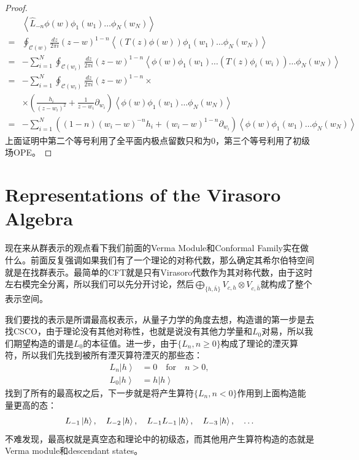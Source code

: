 \begin{proof}
	\begin{equation}
		\begin{aligned}
			&\left\langle\widehat{L}_{-n}\phi(w)\phi_1(w_1)\ldots\phi_N(w_N)\right\rangle  \\
			=&\oint_{\mathcal{C}(w)}\frac{dz}{2\pi i}\left.(z-w)^{1-n}\left\langle\left(T(z)\phi(w)\right)\phi_1(w_1)\ldots\phi_N(w_N)\right\rangle\right.  \\
			=&-\sum_{i=1}^N\oint_{\mathcal{C}(w_i)}\frac{dz}{2\pi i}\left.(z-w)^{1-n}\left\langle\phi(w)\phi_1(w_1)\ldots\left(T(z)\phi_i(w_i)\right)\ldots\phi_N(w_N)\right\rangle\right.  \\
			=&-\sum_{i=1}^N\oint_{\mathcal{C}(w_i)}\frac{dz}{2\pi i}\left(z-w\right)^{1-n}\times  \\
			&\times\left(\frac{h_i}{(z-w_i)^2}+\frac1{z-w_i}\partial_{w_i}\right)\left\langle\phi(w)\phi_1(w_1)\ldots\phi_N(w_N)\right\rangle  \\
			=&-\sum_{i=1}^N\left((1-n)\left(w_i-w\right)^{-n}h_i+\left(w_i-w\right)^{1-n}\partial_{w_i}\right)\left<\phi(w)\phi_1(w_1)\ldots\phi_N(w_N)\right>
		\end{aligned}
	\end{equation}
	上面证明中第二个等号利用了全平面内极点留数只和为0，第三个等号利用了初级场OPE。
\end{proof}
\section{Representations of the Virasoro Algebra}
现在来从群表示的观点看下我们前面的Verma Module和Conformal Family实在做什么。前面反复强调如果我们有了一个理论的对称代数，那么确定其希尔伯特空间就是在找群表示。最简单的CFT就是只有Virasoro代数作为其对称代数，由于这时左右模完全分离，所以我们可以先分开讨论，然后$\bigoplus_{\{h,\bar h\}} V_{c,h}\otimes V_{c,\bar h}$就构成了整个表示空间。

我们要找的表示是所谓最高权表示，从量子力学的角度去想，构造谱的第一步是去找CSCO，由于理论没有其他对称性，也就是说没有其他力学量和$L_0$对易，所以我们期望构造的谱是$L_0$的本征值。进一步，由于$\{L_n,n\geq0\}$构成了理论的湮灭算符，所以我们先找到被所有湮灭算符湮灭的那些态：
\begin{equation}
	\begin{aligned}L_n\left|h\right\rangle&=0\quad\text{for}\quad n>0,\\L_0\left|h\right\rangle&=h\left|h\right\rangle\end{aligned}
\end{equation}
找到了所有的最高权之后，下一步就是将产生算符$\{L_{n},n<0\}$作用到上面构造能量更高的态：
\begin{equation}
	L_{-1}\ket{h},\quad L_{-2}\ket{h},\quad L_{-1}L_{-1}\ket{h},\quad L_{-3}\ket{h},\quad\ldots
\end{equation}
不难发现，最高权就是真空态和理论中的初级态，而其他用产生算符构造的态就是Verma module和descendant states。


